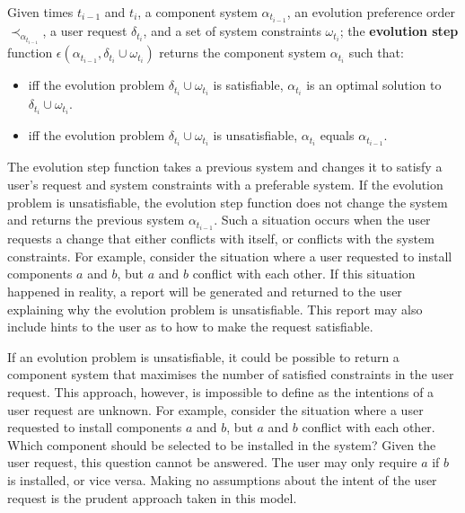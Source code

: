 \begin{defs}
\label{formal.stepdef}
Given times $t_{i-1}$ and $t_i$, a component system $\alpha_{t_{i-1}}$, an evolution preference order $\prec_{\alpha_{t_{i-1}}}$, 
a user request $\delta_{t_i}$, and a set of system constraints $\omega_{t_i}$;
the \textbf{evolution step} function  $\epsilon(\alpha_{t_{i-1}},\delta_{t_i} \cup \omega_{t_i})$ returns the component system $\alpha_{t_i}$ such that:
\begin{itemize}
  \item iff the evolution problem $\delta_{t_i} \cup \omega_{t_i}$ is satisfiable, $\alpha_{t_i}$ is an optimal solution to $\delta_{t_i} \cup \omega_{t_i}$.
  \item iff the evolution problem $\delta_{t_i} \cup \omega_{t_i}$ is unsatisfiable, $\alpha_{t_i}$ equals $\alpha_{t_{i-1}}$.
\end{itemize}
\end{defs}
The evolution step function takes a previous system and changes it to satisfy a user's request and system constraints with a preferable system.
If the evolution problem is unsatisfiable, the evolution step function does not change the system and returns the previous system $\alpha_{t_{i-1}}$.
Such a situation occurs when the user requests a change that either conflicts with itself, or conflicts with the system constraints.
For example, consider the situation where a user requested to install components $a$ and $b$, but $a$ and $b$ conflict with each other.
If this situation happened in reality, a report will be generated and returned to the user explaining why the evolution problem is unsatisfiable.
This report may also include hints to the user as to how to make the request satisfiable.

If an evolution problem is unsatisfiable, it could be possible to return a component system that maximises the number of satisfied constraints in the user request.
This approach, however, is impossible to define as the intentions of a user request are unknown.
For example, consider the situation where a user requested to install components $a$ and $b$, but $a$ and $b$ conflict with each other.
Which component should be selected to be installed in the system?
Given the user request, this question cannot be answered.
The user may only require $a$ if $b$ is installed, or vice versa.
Making no assumptions about the intent of the user request is the prudent approach taken in this model.

